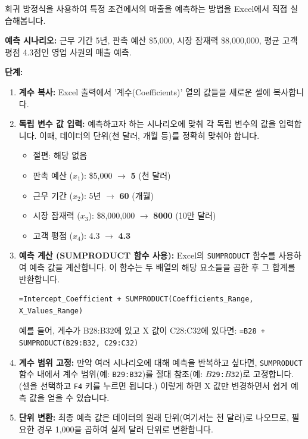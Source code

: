 \documentclass[11pt,a4paper]{book}
\theoremstyle{definition}
\begin{document}
\begin{tcolorbox}[title={\textbf{Excel을 이용한 예측 수행}}]
회귀 방정식을 사용하여 특정 조건에서의 매출을 예측하는 방법을 Excel에서 직접 실습해봅니다.

\textbf{예측 시나리오:}
근무 기간 5년, 판촉 예산 \$5,000, 시장 잠재력 \$8,000,000, 평균 고객 평점 4.3점인 영업 사원의 매출 예측.

\textbf{단계:}
\begin{enumerate}
    \item \textbf{계수 복사:} Excel 출력에서 '계수(Coefficients)' 열의 값들을 새로운 셀에 복사합니다.
    \item \textbf{독립 변수 값 입력:} 예측하고자 하는 시나리오에 맞춰 각 독립 변수의 값을 입력합니다. 이때, 데이터의 단위(천 달러, 개월 등)를 정확히 맞춰야 합니다.
    \begin{itemize}
        \item 절편: 해당 없음
        \item 판촉 예산 ($x_1$): \$5,000 $\rightarrow$ \textbf{5} (천 달러)
        \item 근무 기간 ($x_2$): 5년 $\rightarrow$ \textbf{60} (개월)
        \item 시장 잠재력 ($x_3$): \$8,000,000 $\rightarrow$ \textbf{8000} (10만 달러)
        \item 고객 평점 ($x_4$): 4.3 $\rightarrow$ \textbf{4.3}
    \end{itemize}
    \item \textbf{예측 계산 (SUMPRODUCT 함수 사용):} Excel의 \texttt{SUMPRODUCT} 함수를 사용하여 예측 값을 계산합니다. 이 함수는 두 배열의 해당 요소들을 곱한 후 그 합계를 반환합니다.
    \begin{lstlisting}[language=Excel, caption=SUMPRODUCT 함수를 이용한 예측]
=Intercept_Coefficient + SUMPRODUCT(Coefficients_Range, X_Values_Range)
    \end{lstlisting}
    예를 들어, 계수가 B28:B32에 있고 X 값이 C28:C32에 있다면:
    \texttt{=B28 + SUMPRODUCT(B29:B32, C29:C32)}
    \item \textbf{계수 범위 고정:} 만약 여러 시나리오에 대해 예측을 반복하고 싶다면, \texttt{SUMPRODUCT} 함수 내에서 계수 범위(예: \texttt{B29:B32})를 절대 참조(예: \texttt{$B$29:$B$32})로 고정합니다. (셀을 선택하고 \texttt{F4} 키를 누르면 됩니다.) 이렇게 하면 X 값만 변경하면서 쉽게 예측 값을 얻을 수 있습니다.
    \item \textbf{단위 변환:} 최종 예측 값은 데이터의 원래 단위(여기서는 천 달러)로 나오므로, 필요한 경우 1,000을 곱하여 실제 달러 단위로 변환합니다.
\end{enumerate}


\end{tcolorbox}
\end{document}
